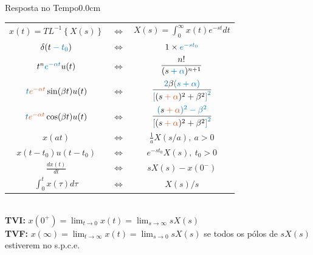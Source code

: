 \documentclass[portuguese,10pt,3col]{cheatsheet}
\begin{document}
\begin{multicols}{3}
\begin{cheatsheetbox}{Resposta no Tempo}{0.0cm}
    \begin{tabular}{c c c}
	    $x(t) = TL^{-1}\left\{X(s)\right\}$ & $\Longleftrightarrow$ & $X(s) = \int_0^\infty x(t)e^{-st} dt$ \\
	    $\delta(t \mathbin{\textcolor{bblue}{-}} \textcolor{bblue}{t_0})$ & $\Longleftrightarrow$ & $1 \times \textcolor{bblue}{e^{-st_0}}$ \\
	     \vspace{0.1cm}
	    $t^n \textcolor{bblue}{e^{-\alpha t}} u(t)$ & $\Longleftrightarrow$ & $\displaystyle \frac{n!}{(s \mathbin{\textcolor{bblue}{+}} \textcolor{bblue}{\alpha})^{n+1}}$ \\
	    \vspace{0.1cm}
	    $\textcolor{bblue}{t} \textcolor{oorange}{e^{-\alpha t}} \sin(\beta t) u(t)$ & $\Longleftrightarrow$ & $\displaystyle \frac{\textcolor{bblue}{2}\beta \textcolor{bblue}{(s} \mathbin{\textcolor{bblue}{+}} \textcolor{bblue}{\alpha)}}{\textcolor{bblue}{\left[\textcolor{black}{(s} \mathbin{\textcolor{oorange}{+}} \textcolor{oorange}{\alpha}\textcolor{black}{)^2} \mathbin{\textcolor{black}{+}} \textcolor{black}{\beta^2}\right]^{\textcolor{bblue}{2}}}}$ \\
	    \vspace{0.1cm}
	    $\textcolor{bblue}{t} \textcolor{oorange}{e^{-\alpha t}} \cos(\beta t) u(t)$ & $\Longleftrightarrow$ & $\displaystyle \frac{\textcolor{bblue}{(} s \mathbin{\textcolor{oorange}{+}} \textcolor{oorange}{\alpha}\textcolor{bblue}{)^2} \mathbin{\textcolor{bblue}{-}} \textcolor{bblue}{\beta^2}}{\textcolor{bblue}{\left[\textcolor{black}{(s} \mathbin{\textcolor{oorange}{+}} \textcolor{oorange}{\alpha}\textcolor{black}{)^2} \mathbin{\textcolor{black}{+}} \textcolor{black}{\beta^2}\right]^{\textcolor{bblue}{2}}}}$ \\
	    $x(at)$ & $\Longleftrightarrow$ & $\frac{1}{a}X(s/a), \ a > 0$ \\
	    $x(t - t_0)u(t - t_0)$ & $\Longleftrightarrow$ & $e^{-st_0}X(s) , \ t_0 > 0$ \\
	    $\displaystyle \frac{dx(t)}{dt}$ & $\Longleftrightarrow$ & $sX(s) - x(0^-)$ \\
	    $\int_0^tx(\tau)d\tau$ & $\Longleftrightarrow$ & $X(s)/s$
	\end{tabular} \\
	
	\textbf{TVI:} $\displaystyle x(0^+) = \lim_{t \to 0}x(t) = \lim_{s \to \infty}sX(s)$ \\
	\textbf{TVF:} $\displaystyle x(\infty) = \lim_{t \to \infty}x(t) = \lim_{s \to 0}sX(s)$ se todos os pólos de $sX(s)$ estiverem no s.p.c.e.\\
	

\end{cheatsheetbox}
\end{multicols}
\end{document}
